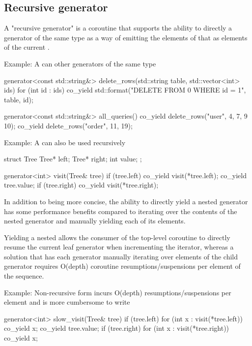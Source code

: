 \documentclass{wg21}
\begin{document}
\subsection{Recursive generator}

A "recursive generator" is a coroutine that supports the ability to directly 
a generator of the same type as a way of emitting the elements of that 
as elements of the current .

Example: A  can  other generators of the same type
\begin{colorblock}
generator<const std::string&> delete_rows(std::string table, std::vector<int> ids) {
  for (int id : ids) {
    co_yield std::format("DELETE FROM {0} WHERE id = {1}", table, id);
  }
}

generator<const std::string&> all_queries() {
  co_yield delete_rows("user", {4, 7, 9 10});
  co_yield delete_rows("order", {11, 19});
}
\end{colorblock}

Example: A  can also be used recursively
\begin{colorblock}
struct Tree {
  Tree* left;
  Tree* right;
  int value;
};

generator<int> visit(Tree& tree) {
  if (tree.left) co_yield visit(*tree.left);
  co_yield tree.value;
  if (tree.right) co_yield visit(*tree.right);
}
\end{colorblock}

In addition to being more concise, the ability to directly yield a nested generator has some
performance benefits compared to iterating over the contents of the nested generator and
manually yielding each of its elements.

Yielding a nested  allows the consumer of the top-level coroutine to
directly resume the current leaf generator when incrementing the iterator, whereas a solution that has each generator manually iterating over elements of the child generator
requires O(depth) coroutine resumptions/suspensions per element of the sequence.

Example: Non-recursive form incurs O(depth) resumptions/suspensions per element
and is more cumbersome to write

\begin{colorblock}
generator<int> slow_visit(Tree& tree) {
  if (tree.left) {
    for (int x : visit(*tree.left))
      co_yield x;
  }
  co_yield tree.value;
  if (tree.right) {
    for (int x : visit(*tree.right))
      co_yield x;
  }
}
\end{colorblock}
\end{document}
